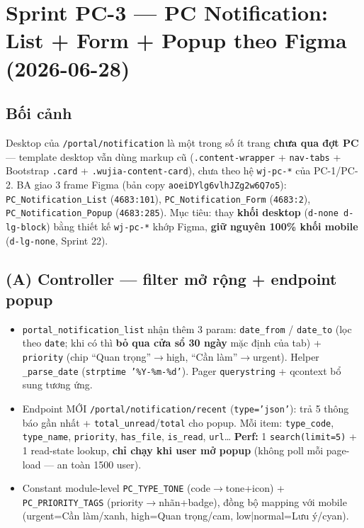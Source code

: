 \chapter{Sprint PC-3 --- PC Notification: List + Form + Popup theo Figma (2026-06-28)}

\section{Bối cảnh}

Desktop của \texttt{/portal/notification} là một trong số ít trang \textbf{chưa qua đợt PC} ---
template desktop vẫn dùng markup cũ (\texttt{.content-wrapper} + \texttt{nav-tabs} + Bootstrap
\texttt{.card} + \texttt{.wujia-content-card}), chưa theo hệ \texttt{wj-pc-*} của PC-1/PC-2. BA giao
3 frame Figma (bản copy \texttt{aoeiDYlg6vlhJZg2w6Q7o5}): \texttt{PC\_Notification\_List} (\texttt{4683:101}),
\texttt{PC\_Notification\_Form} (\texttt{4683:2}), \texttt{PC\_Notification\_Popup} (\texttt{4683:285}).
Mục tiêu: thay \textbf{khối desktop} (\texttt{d-none d-lg-block}) bằng thiết kế \texttt{wj-pc-*} khớp
Figma, \textbf{giữ nguyên 100\% khối mobile} (\texttt{d-lg-none}, Sprint 22).

\section{(A) Controller --- filter mở rộng + endpoint popup}

\begin{itemize}
  \item \texttt{portal\_notification\_list} nhận thêm 3 param: \texttt{date\_from} / \texttt{date\_to}
        (lọc theo \texttt{date}; khi có thì \textbf{bỏ qua cửa sổ 30 ngày} mặc định của tab) +
        \texttt{priority} (chip ``Quan trọng''$\rightarrow$high, ``Cần làm''$\rightarrow$urgent).
        Helper \texttt{\_parse\_date} (\texttt{strptime '\%Y-\%m-\%d'}). Pager \texttt{querystring} +
        qcontext bổ sung tương ứng.
  \item Endpoint MỚI \texttt{/portal/notification/recent} (\texttt{type='json'}): trả 5 thông báo gần
        nhất + \texttt{total\_unread}/\texttt{total} cho popup. Mỗi item: \texttt{type\_code},
        \texttt{type\_name}, \texttt{priority}, \texttt{has\_file}, \texttt{is\_read}, \texttt{url}\dots
        \textbf{Perf:} 1 \texttt{search(limit=5)} + 1 read-state lookup, \textbf{chỉ chạy khi user mở
        popup} (không poll mỗi page-load --- an toàn 1500 user).
  \item Constant module-level \texttt{PC\_TYPE\_TONE} (code$\rightarrow$tone+icon) + \texttt{PC\_PRIORITY\_TAGS}
        (priority$\rightarrow$nhãn+badge), đồng bộ mapping với mobile (urgent=Cần làm/xanh,
        high=Quan trọng/cam, low|normal=Lưu ý/cyan).
\end{itemize}

